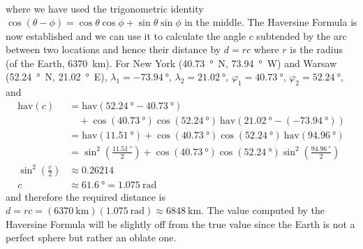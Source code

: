 \begin{solution}
\begin{align*}
\end{align*}
where we have used the trigonometric identity $\cos(\theta-\phi) = \cos \theta \cos \phi + \sin \theta \sin \phi$ in the middle. The Haversine Formula is now established and we can use it to calculate the angle $c$ subtended by the arc between two locations and hence their distance by $d = rc$ where $r$ is the radius (of the Earth, \SI{6370}{\km}). For New York (\SI{40.73}{\degree N}, \SI{73.94}{\degree W}) and Warsaw (\SI{52.24}{\degree N}, \SI{21.02}{\degree E}), $\lambda_1 = \SI{-73.94}{\degree}$, $\lambda_2 = \SI{21.02}{\degree}$, $\varphi_1 = \SI{40.73}{\degree}$, $\varphi_2 = \SI{52.24}{\degree}$, and
\begin{align*}
\text{hav}(c) &= \text{hav}(\SI{52.24}{\degree} - \SI{40.73}{\degree}) \\
&\quad+ \cos (\SI{40.73}{\degree}) \cos (\SI{52.24}{\degree})\ \text{hav}(\SI{21.02}{\degree} - (\SI{-73.94}{\degree})) \\
&= \text{hav}(\SI{11.51}{\degree}) + \cos (\SI{40.73}{\degree}) \cos (\SI{52.24}{\degree})\ \text{hav}(\SI{94.96}{\degree}) \\
&= \sin^2 (\frac{\SI{11.51}{\degree}}{2}) + \cos (\SI{40.73}{\degree}) \cos (\SI{52.24}{\degree}) \sin^2 (\frac{\SI{94.96}{\degree}}{2}) \\
\sin^2 (\frac{c}{2}) &\approx 0.26214 \\
c &\approx \SI{61.6}{\degree} = \SI{1.075}{\radian}
\end{align*}
and therefore the required distance is $d = rc = (\SI{6370}{\km})(\SI{1.075}{\radian}) \approx \SI{6848}{\km}$. The value computed by the Haversine Formula will be slightly off from the true value since the Earth is not a perfect sphere but rather an oblate one.
\end{solution}

